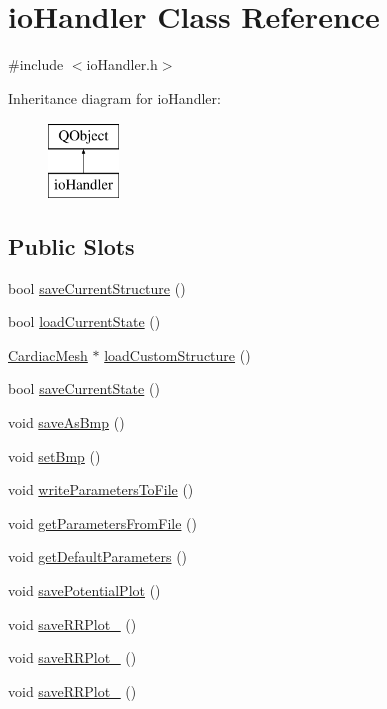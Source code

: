 \hypertarget{classio_handler}{\section{io\+Handler Class Reference}
\label{classio_handler}
}


{\ttfamily \#include $<$io\+Handler.\+h$>$}

Inheritance diagram for io\+Handler\+:\begin{figure}[H]
\begin{center}
\leavevmode
\includegraphics[height=2.000000cm]{classio_handler}
\end{center}
\end{figure}
\subsection*{Public Slots}
\begin{DoxyCompactItemize}
\item 
bool \hyperlink{classio_handler_af01b41a00277e41d62d4d80fd6fe39f7}{save\+Current\+Structure} ()
\item 
bool \hyperlink{classio_handler_a1382429c5838d6eab8195967e9c11678}{load\+Current\+State} ()
\item 
\hyperlink{class_cardiac_mesh}{Cardiac\+Mesh} $\ast$ \hyperlink{classio_handler_aabe0f6cb21a1c374fd020ff42d5c9904}{load\+Custom\+Structure} ()
\item 
bool \hyperlink{classio_handler_a59e5cd8377c13643181d9b6caef839db}{save\+Current\+State} ()
\item 
void \hyperlink{classio_handler_a472e8932c9769f3a577d11ea7c0e224d}{save\+As\+Bmp} ()
\item 
void \hyperlink{classio_handler_a8b295df2cd4f85f178935c310f6dad34}{set\+Bmp} ()
\item 
void \hyperlink{classio_handler_a0549d597c8da9195fd764044cb4c5a63}{write\+Parameters\+To\+File} ()
\item 
void \hyperlink{classio_handler_a32fc5c3861951f75c7ffbf62ed44e3e3}{get\+Parameters\+From\+File} ()
\item 
void \hyperlink{classio_handler_ac9eac90b6bdc44e46d3802e884034abe}{get\+Default\+Parameters} ()
\item 
void \hyperlink{classio_handler_a3ce2a07edc23ff12d084e64b85416954}{save\+Potential\+Plot} ()
\item 
void \hyperlink{classio_handler_aa05a5e6a55ac70333479724c48d09a42}{save\+R\+R\+Plot\+\_} ()
\item 
void \hyperlink{classio_handler_aee153e33abd373472c856467563d4c7d}{save\+R\+R\+Plot\+\_} ()
\item 
void \hyperlink{classio_handler_a2de36fdfa99f28b20c6fe1b2069b75ad}{save\+R\+R\+Plot\+\_} ()
\end{DoxyCompactItemize}
